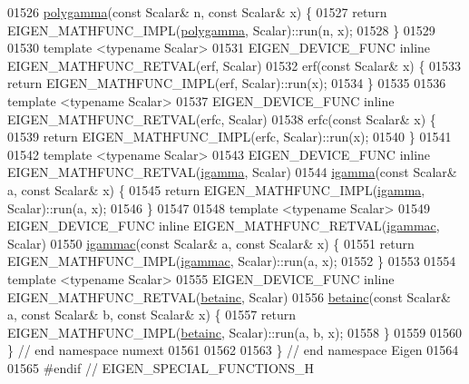 \begin{DoxyCode}
01526 \hyperlink{namespace_eigen_ae3b47a13a0699f5dbaa0623c11333dca}{polygamma}(\textcolor{keyword}{const} Scalar& n, \textcolor{keyword}{const} Scalar& x) \{
01527     \textcolor{keywordflow}{return} EIGEN\_MATHFUNC\_IMPL(\hyperlink{namespace_eigen_ae3b47a13a0699f5dbaa0623c11333dca}{polygamma}, Scalar)::run(n, x);
01528 \}
01529 
01530 \textcolor{keyword}{template} <\textcolor{keyword}{typename} Scalar>
01531 EIGEN\_DEVICE\_FUNC \textcolor{keyword}{inline} EIGEN\_MATHFUNC\_RETVAL(erf, Scalar)
01532     erf(\textcolor{keyword}{const} Scalar& x) \{
01533   \textcolor{keywordflow}{return} EIGEN\_MATHFUNC\_IMPL(erf, Scalar)::run(x);
01534 \}
01535 
01536 \textcolor{keyword}{template} <\textcolor{keyword}{typename} Scalar>
01537 EIGEN\_DEVICE\_FUNC \textcolor{keyword}{inline} EIGEN\_MATHFUNC\_RETVAL(erfc, Scalar)
01538     erfc(\textcolor{keyword}{const} Scalar& x) \{
01539   \textcolor{keywordflow}{return} EIGEN\_MATHFUNC\_IMPL(erfc, Scalar)::run(x);
01540 \}
01541 
01542 \textcolor{keyword}{template} <\textcolor{keyword}{typename} Scalar>
01543 EIGEN\_DEVICE\_FUNC \textcolor{keyword}{inline} EIGEN\_MATHFUNC\_RETVAL(\hyperlink{namespace_eigen_af5aa651137636b1cdbd27de1cfe91148}{igamma}, Scalar)
01544     \hyperlink{namespace_eigen_af5aa651137636b1cdbd27de1cfe91148}{igamma}(\textcolor{keyword}{const} Scalar& a, \textcolor{keyword}{const} Scalar& x) \{
01545   \textcolor{keywordflow}{return} EIGEN\_MATHFUNC\_IMPL(\hyperlink{namespace_eigen_af5aa651137636b1cdbd27de1cfe91148}{igamma}, Scalar)::run(a, x);
01546 \}
01547 
01548 \textcolor{keyword}{template} <\textcolor{keyword}{typename} Scalar>
01549 EIGEN\_DEVICE\_FUNC \textcolor{keyword}{inline} EIGEN\_MATHFUNC\_RETVAL(\hyperlink{namespace_eigen_a1abaa2ff8c7b1871eaf026a47c6bbf3b}{igammac}, Scalar)
01550     \hyperlink{namespace_eigen_a1abaa2ff8c7b1871eaf026a47c6bbf3b}{igammac}(\textcolor{keyword}{const} Scalar& a, \textcolor{keyword}{const} Scalar& x) \{
01551   \textcolor{keywordflow}{return} EIGEN\_MATHFUNC\_IMPL(\hyperlink{namespace_eigen_a1abaa2ff8c7b1871eaf026a47c6bbf3b}{igammac}, Scalar)::run(a, x);
01552 \}
01553 
01554 \textcolor{keyword}{template} <\textcolor{keyword}{typename} Scalar>
01555 EIGEN\_DEVICE\_FUNC \textcolor{keyword}{inline} EIGEN\_MATHFUNC\_RETVAL(\hyperlink{namespace_eigen_a726eae91d4e91d8e25cbe55fffa6a92f}{betainc}, Scalar)
01556     \hyperlink{namespace_eigen_a726eae91d4e91d8e25cbe55fffa6a92f}{betainc}(\textcolor{keyword}{const} Scalar& a, \textcolor{keyword}{const} Scalar& b, \textcolor{keyword}{const} Scalar& x) \{
01557   \textcolor{keywordflow}{return} EIGEN\_MATHFUNC\_IMPL(\hyperlink{namespace_eigen_a726eae91d4e91d8e25cbe55fffa6a92f}{betainc}, Scalar)::run(a, b, x);
01558 \}
01559 
01560 \}  \textcolor{comment}{// end namespace numext}
01561 
01562 
01563 \}  \textcolor{comment}{// end namespace Eigen}
01564 
01565 \textcolor{preprocessor}{#endif  // EIGEN\_SPECIAL\_FUNCTIONS\_H}
\end{DoxyCode}

